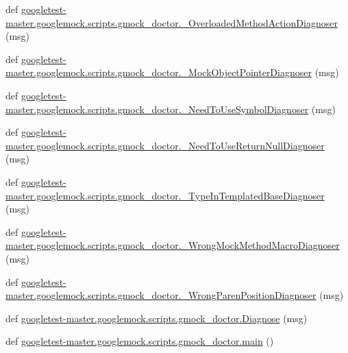 \begin{DoxyCompactItemize}
def \mbox{\hyperlink{namespacegoogletest-master_1_1googlemock_1_1scripts_1_1gmock__doctor_a04c83a4005c616699e927a2f7be479ee}{googletest-\/master.\+googlemock.\+scripts.\+gmock\+\_\+doctor.\+\_\+\+Overloaded\+Method\+Action\+Diagnoser}} (msg)
\item 
def \mbox{\hyperlink{namespacegoogletest-master_1_1googlemock_1_1scripts_1_1gmock__doctor_a471a02832014a22835f67a46042ed705}{googletest-\/master.\+googlemock.\+scripts.\+gmock\+\_\+doctor.\+\_\+\+Mock\+Object\+Pointer\+Diagnoser}} (msg)
\item 
def \mbox{\hyperlink{namespacegoogletest-master_1_1googlemock_1_1scripts_1_1gmock__doctor_a514d14627a866affd9397359b526cbb5}{googletest-\/master.\+googlemock.\+scripts.\+gmock\+\_\+doctor.\+\_\+\+Need\+To\+Use\+Symbol\+Diagnoser}} (msg)
\item 
def \mbox{\hyperlink{namespacegoogletest-master_1_1googlemock_1_1scripts_1_1gmock__doctor_a283d727e80bb015be768c484befbaa9f}{googletest-\/master.\+googlemock.\+scripts.\+gmock\+\_\+doctor.\+\_\+\+Need\+To\+Use\+Return\+Null\+Diagnoser}} (msg)
\item 
def \mbox{\hyperlink{namespacegoogletest-master_1_1googlemock_1_1scripts_1_1gmock__doctor_ae566a8c270c63f6caf9c038371401251}{googletest-\/master.\+googlemock.\+scripts.\+gmock\+\_\+doctor.\+\_\+\+Type\+In\+Templated\+Base\+Diagnoser}} (msg)
\item 
def \mbox{\hyperlink{namespacegoogletest-master_1_1googlemock_1_1scripts_1_1gmock__doctor_af88df928c04b102a80ca5d670865f06c}{googletest-\/master.\+googlemock.\+scripts.\+gmock\+\_\+doctor.\+\_\+\+Wrong\+Mock\+Method\+Macro\+Diagnoser}} (msg)
\item 
def \mbox{\hyperlink{namespacegoogletest-master_1_1googlemock_1_1scripts_1_1gmock__doctor_a03e2896d488ee2109088446d8e74653c}{googletest-\/master.\+googlemock.\+scripts.\+gmock\+\_\+doctor.\+\_\+\+Wrong\+Paren\+Position\+Diagnoser}} (msg)
\item 
def \mbox{\hyperlink{namespacegoogletest-master_1_1googlemock_1_1scripts_1_1gmock__doctor_abbaae28b08ad22a25b012e438ae92f75}{googletest-\/master.\+googlemock.\+scripts.\+gmock\+\_\+doctor.\+Diagnose}} (msg)
\item 
def \mbox{\hyperlink{namespacegoogletest-master_1_1googlemock_1_1scripts_1_1gmock__doctor_a969fac0e0ab9ba8ad46340aa1dbad360}{googletest-\/master.\+googlemock.\+scripts.\+gmock\+\_\+doctor.\+main}} ()
\end{DoxyCompactItemize}
